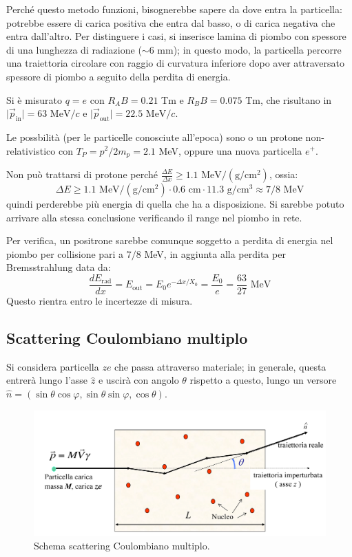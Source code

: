 \documentclass[10pt, a4paper]{scrartcl}
\numberwithin{equation}{subsection}
\theoremstyle{style1}
\begin{document}
Perch\'e questo metodo funzioni, bisognerebbe sapere da dove entra la particella: potrebbe essere di carica positiva che entra dal basso, o di carica negativa che entra dall'altro. Per distinguere i casi, si inserisce lamina di piombo con spessore di una lunghezza di radiazione ($\sim 6$ mm); in questo modo, la particella percorre una traiettoria circolare con raggio di curvatura inferiore dopo aver attraversato spessore di piombo a seguito della perdita di energia.

Si \`e misurato $q = e$ con $R_A B = 0.21$ Tm e $R_B B = 0.075$ Tm, che risultano in $\lvert \vec{p} _\text{in}\rvert = 63 \text{ MeV} / c$ e $\lvert \vec{p}_\text{out} \rvert = 22.5 \text{ MeV}/c$.

Le possbilit\`a (per le particelle conosciute all'epoca) sono o un protone non-relativistico con $T_P = p^2 / 2m_p = 2.1$ MeV, oppure una nuova particella $e^+$.

Non pu\`o trattarsi di protone perch\'e $\frac{\Delta E}{\Delta x}\ge 1.1 \text{ MeV}/(\text{g} / \text{cm}^2)$, ossia:
\[
\Delta E \ge  1.1 \text{ MeV}/(\text{g} / \text{cm}^2)\cdot 0.6 \text{ cm} \cdot 11.3 \text{ g}/ \text{cm}^3 \approx 7 / 8 \text{ MeV}
\] 
quindi perderebbe pi\`u energia di quella che ha a disposizione. Si sarebbe potuto arrivare alla stessa conclusione verificando il range nel piombo in rete.

Per verifica, un positrone sarebbe comunque soggetto a perdita di energia nel piombo per collisione pari a $7 / 8$ MeV, in aggiunta alla perdita per Bremsstrahlung data da:
\[
\frac{d E_\text{rad}}{d x}  = E_\text{out} = E_0 e^{ - \Delta  x / X_0} = \frac{E_0}{e} = \frac{63}{27} \text{ MeV}
\] 
Questo rientra entro le incertezze di misura.

\subsection{Scattering Coulombiano multiplo}
Si considera particella $ze$ che passa attraverso materiale; in generale, questa entrer\`a lungo l'asse $\hat{z}$ e uscir\`a con angolo $\theta $ rispetto a questo, lungo un versore $\hat{n} = (\sin \theta  \cos \varphi , \sin \theta  \sin \varphi , \cos \theta )$.

\begin{figure}[h!]
	\centering
	\includegraphics[width=.8\columnwidth]{mcoul.png}
	\caption{Schema scattering Coulombiano multiplo.}
\end{figure}
\end{document}
